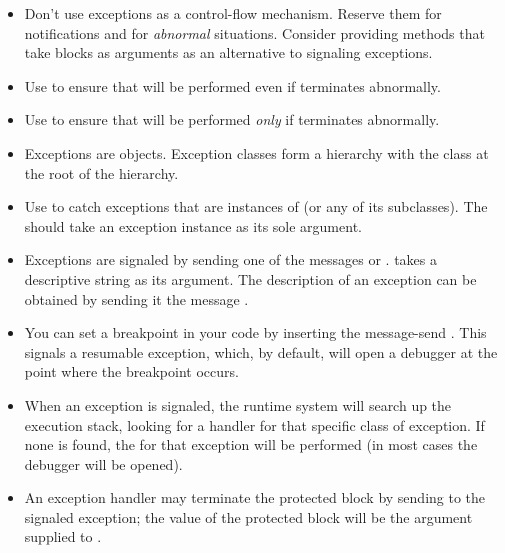 \documentclass[a4paper,10pt,twoside]{book}
\begin{document}
\begin{itemize}
\item Don't use exceptions as a control-flow mechanism.  Reserve them for notifications and for \emph{abnormal} situations.  Consider providing methods that take blocks as arguments as an alternative to signaling exceptions.

\item Use  to ensure that  will be performed even if  terminates abnormally.

\item Use  to ensure that  will be performed \emph{only} if  terminates abnormally.

\item Exceptions are objects. Exception classes form a hierarchy with the class  at the root of the hierarchy.

\item Use  to catch exceptions that are instances of  (or any of its subclasses). The  should take an exception instance as its sole argument.

\item Exceptions are signaled by sending one of the messages  or .  takes a descriptive string as its argument. The description of an exception can be obtained by sending it the message .

\item You can set a breakpoint in your code by inserting the message-send . This signals a resumable  exception, which, by default, will open a debugger at the point where the breakpoint occurs.

\item When an exception is signaled, the runtime system will search up the execution stack, looking for a handler for that specific class of exception. If none is found, the  for that exception will be performed (\ie in most cases the debugger will be opened).

\item An exception handler may terminate the protected block by sending  to the signaled exception; the value of the protected block will be the argument supplied to . 


\end{itemize}
\end{document}

